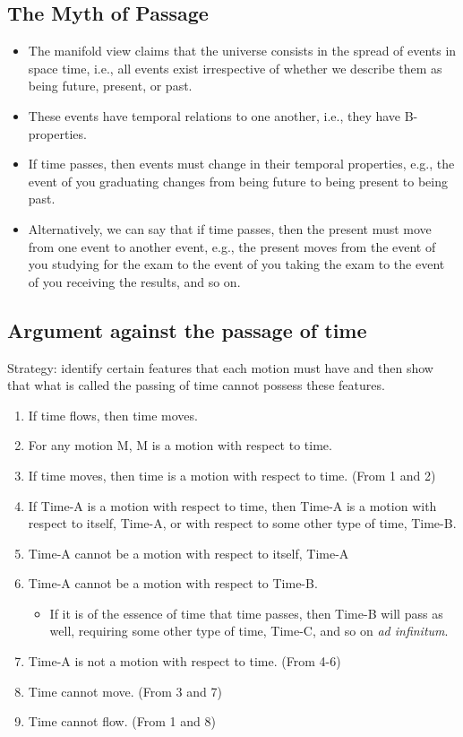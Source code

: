 \documentclass[oneside]{article}
\begin{document}
\subsection*{The Myth of Passage}


\begin{itemize}
\item The manifold view claims that the universe consists in the spread of events in space time, i.e., all events exist irrespective of whether we describe them as being future, present, or past.  
\item These events have temporal relations to one another, i.e., they have B-properties. 
\item If time passes, then events must change in their temporal properties, e.g., the event of you graduating changes from being future to being present to being past. 
\item Alternatively, we can say that if time passes, then the present must move from one event to another event, e.g., the present moves from the event of you studying for the exam to the event of you taking the exam to the event of you receiving the results, and so on. 
\end{itemize}

\subsection*{Argument against the passage of time}

\noindent Strategy: identify certain features that each motion must have and then show that what is called the passing of time cannot possess these features. 

\begin{enumerate} 
\item If time flows, then time moves. 
\item For any motion M, M is a motion with respect to time.
\item If time moves, then time is a motion with respect to time. (From 1 and 2) 
\item If Time-A is a motion with respect to time, then Time-A is a motion with respect to itself, Time-A, or with respect to some other type of time, Time-B.  
\item Time-A cannot be a motion with respect to itself, Time-A
\item Time-A cannot be a motion with respect to Time-B. 
\begin{itemize}
\item If it is of the essence of time that time passes, then Time-B will pass as well, requiring some other type of time, Time-C, and so on \emph{ad infinitum}. 
\end{itemize}
\item Time-A is not a motion with respect to time. (From 4-6)
\item Time cannot move. (From 3 and 7) 
\item Time cannot flow. (From 1 and 8)
\end{enumerate}
\end{document}
